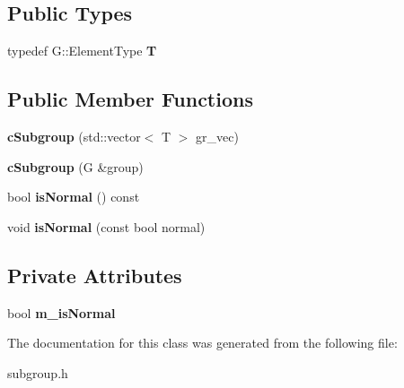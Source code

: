 \subsection*{Public Types}
\begin{DoxyCompactItemize}
\item 
\hypertarget{classcSubgroup_ab88b056e488e5b0b6c7849e9a4357371}{typedef G\-::\-Element\-Type {\bfseries T}}\label{classcSubgroup_ab88b056e488e5b0b6c7849e9a4357371}

\end{DoxyCompactItemize}
\subsection*{Public Member Functions}
\begin{DoxyCompactItemize}
\item 
\hypertarget{classcSubgroup_aa47db239ee5fc0c2904fc5870e102daa}{{\bfseries c\-Subgroup} (std\-::vector$<$ T $>$ gr\-\_\-vec)}\label{classcSubgroup_aa47db239ee5fc0c2904fc5870e102daa}

\item 
\hypertarget{classcSubgroup_ad10d7eaf034a3f96bfdb84e824f7ba30}{{\bfseries c\-Subgroup} (G \&group)}\label{classcSubgroup_ad10d7eaf034a3f96bfdb84e824f7ba30}

\item 
\hypertarget{classcSubgroup_a5c239313a0f1ae9ae64f87da3c552bee}{bool {\bfseries is\-Normal} () const }\label{classcSubgroup_a5c239313a0f1ae9ae64f87da3c552bee}

\item 
\hypertarget{classcSubgroup_a39fa2b6d316997d9ecbb2fc51cf86bc6}{void {\bfseries is\-Normal} (const bool normal)}\label{classcSubgroup_a39fa2b6d316997d9ecbb2fc51cf86bc6}

\end{DoxyCompactItemize}
\subsection*{Private Attributes}
\begin{DoxyCompactItemize}
\item 
\hypertarget{classcSubgroup_a21daac84974df25a48465da9438cb552}{bool {\bfseries m\-\_\-is\-Normal}}\label{classcSubgroup_a21daac84974df25a48465da9438cb552}

\end{DoxyCompactItemize}


The documentation for this class was generated from the following file\-:\begin{DoxyCompactItemize}
\item 
subgroup.\-h\end{DoxyCompactItemize}
